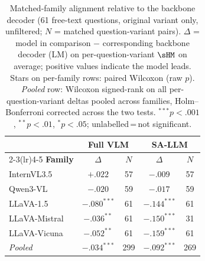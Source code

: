 \begin{table}[ht]
\centering\small\setlength{\tabcolsep}{5pt}
\begin{tabular}{l cc cc}
\toprule
& \multicolumn{2}{c}{\textbf{Full VLM}} & \multicolumn{2}{c}{\textbf{SA-LLM}} \\
\cmidrule(lr){2-3}\cmidrule(lr){4-5}
\textbf{Family} & $\Delta$ & $N$ & $\Delta$ & $N$ \\
\midrule
InternVL3.5 & $+.022$ & 57 & $-.009$ & 57 \\
Qwen3-VL & $-.020$ & 59 & $-.017$ & 59 \\
LLaVA-1.5 & $-.080^{***}$ & 61 & $-.144^{***}$ & 61 \\
LLaVA-Mistral & $-.036^{**}$ & 61 & $-.150^{***}$ & 31 \\
LLaVA-Vicuna & $-.052^{**}$ & 61 & $-.159^{***}$ & 61 \\
\midrule
\textit{Pooled} & $-.034^{***}$ & 299 & $-.092^{***}$ & 269 \\
\bottomrule
\end{tabular}
\caption{Matched-family alignment relative to the backbone decoder (61 free-text questions, original variant only, unfiltered; $N$ = matched question-variant pairs).
$\Delta$ = model in comparison $-$ corresponding backbone decoder (LM) on per-question-variant $\sHM$ on average; positive values indicate the model leads.
Stars on per-family rows: paired Wilcoxon (raw $p$). \textit{Pooled} row: Wilcoxon signed-rank on all per-question-variant deltas pooled across families, Holm--Bonferroni corrected across the two tests. ${}^{***}p{<}.001$, ${}^{**}p{<}.01$, ${}^{*}p{<}.05$; unlabelled\,=\,not significant.}
\label{tab:matched_family_alignment_tests_ft_orig_raw}
\end{table}